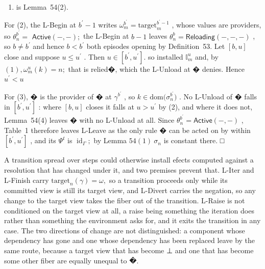 \documentclass[
  10
]{article}
\providecommand{\tightlist}{%
  \setlength{\itemsep}{0pt}\setlength{\parskip}{0pt}}
\begin{document}
\begin{enumerate}
\def\labelenumi{(\arabic{enumi})}
\tightlist
\item
  is Lemma~54(2).
\end{enumerate}

For (2), the L-Begin at \(b ^ { \prime } - 1\) writes
\(\omega _ { m } ^ { b ^ { \prime } } = \mathrm { t a r g e t } _ { m } ^ { b ^ { \prime } - 1 }\)
, whose values are providers, so
\(\theta _ { n } ^ { b ^ { \prime } } =\)
\(\mathsf { A c t i v e ( - , - ) } ;\) the L-Begin at \(b - 1\) leaves
\(\theta _ { n } ^ { b } = { \mathsf { R e l o a d i n g } } ( - , - , - )\)
, so \(b \neq b ^ { \prime }\) and hence \(b < b ^ { \prime }\) both
episodes opening by Definition~53. Let \([ b , u ]\) close and suppose
\(u \leq u ^ { \prime }\) . Then
\(u \in [ b ^ { \prime } , u ^ { \prime } ] .\) so installed
\(\mathbb { I } _ { m } ^ { u }\) and, by
\(( 1 ) , \omega _ { m } ^ { u } ( k ) = n ;\) that is relied�, which
the L-Unload at � denies. Hence \(u ^ { \prime } < u\)

For (3), � is the provider of � at \(\gamma ^ { b ^ { \prime } }\) , so
\(k \in \mathrm { d o m } \bigl ( \sigma _ { n } ^ { b ^ { \prime } } \bigr )\)
. No L-Unload of � falls in \([ b ^ { \prime } , u ^ { \prime } ]\) :
where \([ b , u ]\) closes it falls at \(u > u ^ { \prime }\) by (2),
and where it does not, Lemma~54(4) leaves � with no L-Unload at all.
Since
\(\theta _ { n } ^ { b ^ { \prime } } = \mathsf { A c t i v e } ( - , - )\)
, Table~1 therefore leaves L-Leave as the only rule � can be acted on by
within \([ b ^ { \prime } , u ^ { \prime } ]\) , and its
\(\Psi ^ { t }\) is \(\operatorname { i d } _ { \Gamma } ;\) by Lemma
\(5 4 ( 1 ) ~ \sigma _ { n }\) is constant there. □

A transition spread over steps could otherwise install efects computed
against a resolution that has changed under it, and two premises prevent
that. L-Iter and L-Finish carry
\(\mathrm { t a r g e t } _ { n } ( \gamma ) = \omega ,\) so a
transition proceeds only while its committed view is still its target
view, and L-Divert carries the negation, so any change to the target
view takes the fiber out of the transition. L-Raise is not conditioned
on the target view at all, a raise being something the iteration does
rather than something the environment asks for, and it exits the
transition in any case. The two directions of change are not
distinguished: a component whose dependency has gone and one whose
dependency has been replaced leave by the same route, because a target
view that has become ⊥ and one that has become some other fiber are
equally unequal to �.
\end{document}
